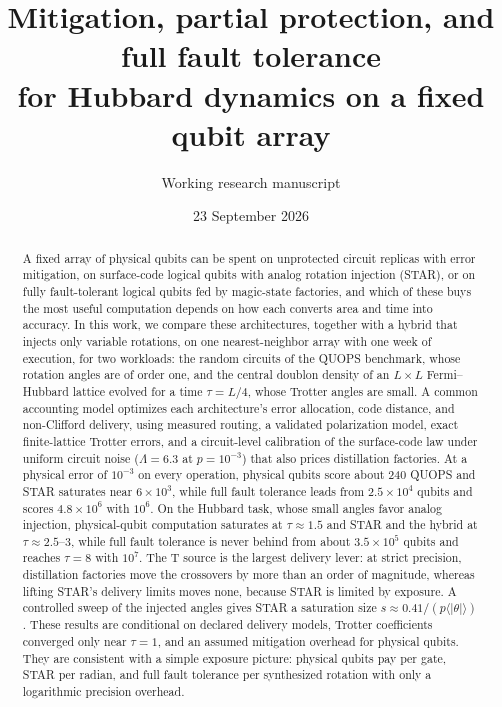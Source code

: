 \documentclass[11pt]{article}
\title{Mitigation, partial protection, and full fault tolerance\\for Hubbard dynamics on a fixed qubit array}
\author{Working research manuscript}
\date{23 September 2026}
\begin{document}
\begin{abstract}
A fixed array of physical qubits can be spent on unprotected circuit replicas
with error mitigation, on surface-code logical qubits with analog rotation
injection (STAR), or on fully fault-tolerant logical qubits fed by magic-state
factories, and which of these buys the most useful computation depends on how
each converts area and time into accuracy. In this work, we compare these
architectures, together with a hybrid that injects only variable rotations, on
one nearest-neighbor array with one week of execution, for two workloads: the
random circuits of the QUOPS benchmark, whose rotation angles are of order one,
and the central doublon density of an $L\times L$ Fermi--Hubbard lattice evolved
for a time $\tau=L/4$, whose Trotter angles are small. A common accounting model
optimizes each architecture's error allocation, code distance, and non-Clifford
delivery, using measured routing, a validated polarization model, exact
finite-lattice Trotter errors, and a circuit-level calibration of the
surface-code law under uniform circuit noise ($\Lambda=6.3$ at $p=10^{-3}$) that
also prices distillation factories. At a physical error of $10^{-3}$ on every
operation, physical qubits score about 240 QUOPS and STAR saturates near
$6\times10^3$, while full fault tolerance leads from $2.5\times10^4$ qubits and
scores $4.8\times10^6$ with $10^6$. On
the Hubbard task, whose small angles favor analog injection, physical-qubit
computation saturates at $\tau\approx1.5$ and STAR and the hybrid at
$\tau\approx2.5$--3, while full fault tolerance is never behind from about
$3.5\times10^5$ qubits and reaches $\tau=8$ with $10^7$. The T source is the
largest delivery lever: at strict precision, distillation factories move the
crossovers by more than an order of magnitude, whereas lifting STAR's delivery
limits moves none, because STAR is limited by exposure. A controlled sweep of the
injected angles gives STAR a saturation size
$s\approx0.41/(p\langle|\theta|\rangle)$. These results are conditional on
declared delivery models, Trotter coefficients converged only near $\tau=1$, and
an assumed mitigation overhead for physical qubits. They are consistent with a
simple exposure picture: physical qubits pay per gate, STAR per radian, and full
fault tolerance per synthesized rotation with only a logarithmic precision
overhead.
\end{abstract}
\end{document}
